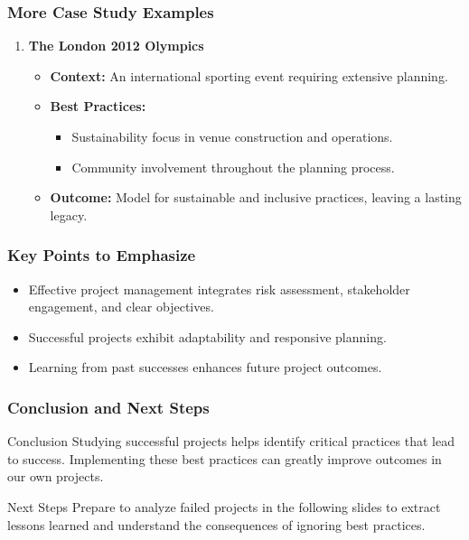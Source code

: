 \documentclass[aspectratio=169]{beamer}
\begin{document}
\begin{frame}[fragile]
    \frametitle{More Case Study Examples}
    \begin{enumerate}[resume]
        \item \textbf{The London 2012 Olympics}
            \begin{itemize}
                \item \textbf{Context:} An international sporting event requiring extensive planning.
                \item \textbf{Best Practices:}
                    \begin{itemize}
                        \item Sustainability focus in venue construction and operations.
                        \item Community involvement throughout the planning process.
                    \end{itemize}
                \item \textbf{Outcome:} Model for sustainable and inclusive practices, leaving a lasting legacy.
            \end{itemize}
    \end{enumerate}
\end{frame}

\begin{frame}[fragile]
    \frametitle{Key Points to Emphasize}
    \begin{itemize}
        \item Effective project management integrates risk assessment, stakeholder engagement, and clear objectives.
        \item Successful projects exhibit adaptability and responsive planning.
        \item Learning from past successes enhances future project outcomes.
    \end{itemize}
\end{frame}

\begin{frame}[fragile]
    \frametitle{Conclusion and Next Steps}
    \begin{block}{Conclusion}
        Studying successful projects helps identify critical practices that lead to success. Implementing these best practices can greatly improve outcomes in our own projects.
    \end{block}
    \begin{block}{Next Steps}
        Prepare to analyze failed projects in the following slides to extract lessons learned and understand the consequences of ignoring best practices.
    \end{block}
\end{frame}
\end{document}
